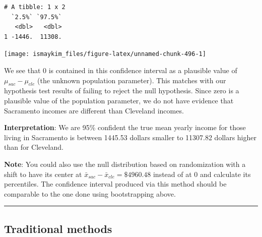 \documentclass[12pt,]{krantz}
\makeatletter
\newenvironment{Shaded}{\begin{snugshade}}{\end{snugshade}}
\newcommand{\KeywordTok}[1]{\textcolor[rgb]{0.27,0.27,0.27}{\textbf{#1}}}
\newcommand{\DataTypeTok}[1]{\textcolor[rgb]{0.27,0.27,0.27}{#1}}
\newcommand{\StringTok}[1]{\textcolor[rgb]{0.5,0.5,0.5}{#1}}
\newcommand{\OperatorTok}[1]{\textcolor[rgb]{0.43,0.43,0.43}{\textbf{#1}}}
\newcommand{\NormalTok}[1]{#1}
\newenvironment{kframe}{%
\medskip{}
\setlength{\fboxsep}{.8em}
 \def\at@end@of@kframe{}%
 \ifinner\ifhmode%
  \def\at@end@of@kframe{\end{minipage}}%
  \begin{minipage}{\columnwidth}%
 \fi\fi%
 \def\FrameCommand##1{\hskip\@totalleftmargin \hskip-\fboxsep
 \colorbox{shadecolor}{##1}\hskip-\fboxsep
     \hskip-\linewidth \hskip-\@totalleftmargin \hskip\columnwidth}%
 \MakeFramed {\advance\hsize-\width
   \@totalleftmargin\z@ \linewidth\hsize
   \@setminipage}}%
 {\par\unskip\endMakeFramed%
 \at@end@of@kframe}
\renewenvironment{Shaded}{\begin{kframe}}{\end{kframe}}
\theoremstyle{definition}
\theoremstyle{definition}
\theoremstyle{definition}
\theoremstyle{remark}
\makeatother
\begin{document}
\begin{Shaded}
\end{Shaded}

\begin{verbatim}
# A tibble: 1 x 2
  `2.5%` `97.5%`
   <dbl>   <dbl>
1 -1446.  11308.
\end{verbatim}

\begin{Shaded}
\end{Shaded}

\begin{center}\texttt{[image: ismaykim\_files/figure-latex/unnamed-chunk-496-1]} \end{center}

We see that 0 is contained in this confidence interval as a plausible
value of \(\mu_{sac} - \mu_{cle}\) (the unknown population parameter).
This matches with our hypothesis test results of failing to reject the
null hypothesis. Since zero is a plausible value of the population
parameter, we do not have evidence that Sacramento incomes are different
than Cleveland incomes.

\textbf{Interpretation}: We are 95\% confident the true mean yearly
income for those living in Sacramento is between 1445.53 dollars smaller
to 11307.82 dollars higher than for Cleveland.

\textbf{Note}: You could also use the null distribution based on
randomization with a shift to have its center at
\(\bar{x}_{sac} - \bar{x}_{cle} = \$4960.48\) instead of at 0 and
calculate its percentiles. The confidence interval produced via this
method should be comparable to the one done using bootstrapping above.

\begin{center}\rule{0.5\linewidth}{\linethickness}\end{center}

\subsection{Traditional methods}\label{traditional-methods-3}
\end{document}
